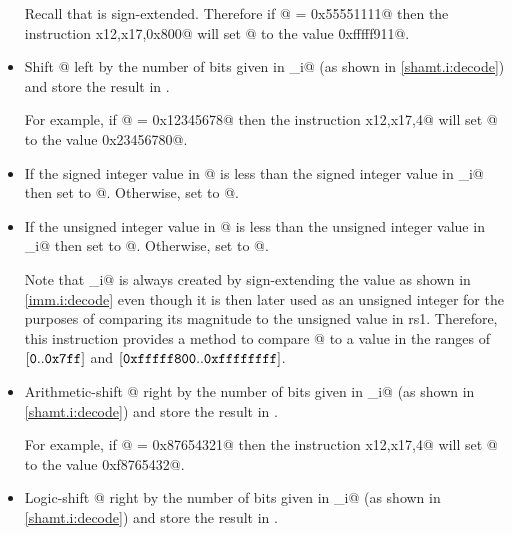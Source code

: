\begin{itemize}
Recall that \verb@imm@ is sign-extended.
Therefore if @ = \verb@0x55551111@ then the instruction 
\verb@ori x12,x17,0x800@ will set @ to the value \verb@0xfffff911@.

\item{}
\label{insn:slli}

Shift @ left by the number of bits given in \verb@shamt_i@ 
(as shown in \autoref{shamt.i:decode}) and store the result in \verb@rd@.

For example, if @ = \verb@0x12345678@ then the instruction 
\verb@slli x12,x17,4@ will set @ to the value \verb@0x23456780@.

\item{}
\label{insn:slti}

If the signed integer value in @ is less than the
signed integer value in \verb@imm_i@ then set \verb@rd@ to @.
Otherwise, set \verb@rd@ to @.

\item{}
\label{insn:sltiu}

If the unsigned integer value in @ is less than the
unsigned integer value in \verb@imm_i@ then set \verb@rd@ to @.
Otherwise, set \verb@rd@ to @.

Note that \verb@imm_i@ is always created by sign-extending the \verb@imm@ value 
as shown in \autoref{imm.i:decode} even though it is then later used as an unsigned 
integer for the purposes of comparing its magnitude to the unsigned value in rs1.  
Therefore, this instruction provides a method to compare @ to a value 
in the ranges of 
$[\text{\tt 0}..\text{\tt 0x7ff}]$ and $[\text{\tt 0xfffff800}..\text{\tt 0xffffffff}]$.

\item{}
\label{insn:srai}

Arithmetic-shift @ right by the number of bits given in \verb@shamt_i@
(as shown in \autoref{shamt.i:decode}) and store the result in \verb@rd@.

For example, if @ = \verb@0x87654321@ then the instruction 
\verb@srai x12,x17,4@ will set @ to the value \verb@0xf8765432@.

\item{}
\label{insn:srli}

Logic-shift @ right by the number of bits given in \verb@shamt_i@
(as shown in \autoref{shamt.i:decode}) and store the result in \verb@rd@.


\end{itemize}
